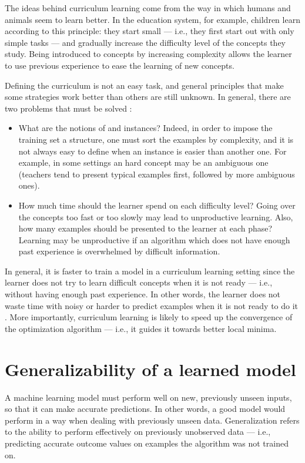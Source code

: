                 The ideas behind curriculum learning come from the way in which humans and animals seem to learn better. In the education system, for example, children learn according to this principle: they start small --- i.e., they first start out with only simple tasks --- and gradually increase the difficulty level of the concepts they study. Being introduced to concepts by increasing complexity allows the learner to use previous experience to ease the learning of new concepts.
                
                Defining the curriculum is not an easy task, and general principles that make some strategies work better than others are still unknown. In general, there are two problems that must be solved \cite{Hacohen}:
                \begin{itemize}
                    \item What are the notions of  and  instances? Indeed, in order to impose the training set a structure, one must sort the examples by complexity, and it is not always easy to define when an instance is easier than another one. For example, in some settings an hard concept may be an ambiguous one (teachers tend to present typical examples first, followed by more ambiguous ones).
                    \item How much time should the learner spend on each difficulty level? Going over the concepts too fast or too slowly may lead to unproductive learning. Also, how many examples should be presented to the learner at each phase? Learning may be unproductive if an algorithm which does not have enough past experience is overwhelmed by difficult information.
                \end{itemize}
                
                In general, it is faster to train a model in a curriculum learning setting since the learner does not try to learn difficult concepts when it is not ready --- i.e., without having enough past experience. In other words, the learner does not waste time with noisy or harder to predict examples when it is not ready to do it \cite{Bengio}. More importantly, curriculum learning is likely to speed up the convergence of the optimization algorithm --- i.e., it guides it towards better local minima.
    \section{Generalizability of a learned model}\label{generalizability}
        A machine learning model must perform well on new, previously unseen inputs, so that it can make accurate predictions. In other words, a good model would perform in a  way when dealing with previously unseen data. Generalization refers to the ability to perform effectively on previously unobserved data --- i.e., predicting accurate outcome values on examples the algorithm was not trained on.

